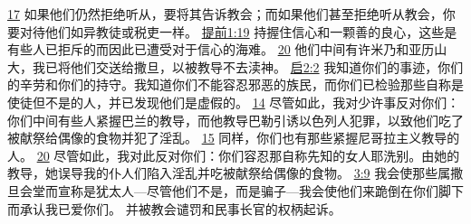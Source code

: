 \documentclass[12pt, a4paper, oneside]{ctexart}
\begin{document}
{		\href{https://biblehub.com/matthew/18-17.htm}{17} 如果他们仍然拒绝听从，要将其告诉教会；而如果他们甚至拒绝听从教会，你要对待他们如异教徒或税吏一样。
		\href{https://biblehub.com/1_timothy/1-19.htm}{提前1:19} 持握住信心和一颗善的良心，这些是有些人已拒斥的而因此已遭受对于信心的海难。
		\href{https://biblehub.com/1_timothy/1-20.htm}{20} 他们中间有许米乃和亚历山大，我已将他们交送给撒旦，以被教导不去渎神。
		\href{https://biblehub.com/revelation/2-2.htm}{启2:2} 我知道你们的事迹，你们的辛劳和你们的持守。我知道你们不能容忍邪恶的族民，而你们已检验那些自称是使徒但不是的人，并已发现他们是虚假的。
		\href{https://biblehub.com/revelation/2-14.htm}{14} 尽管如此，我对少许事反对你们：你们中间有些人紧握巴兰的教导，而他教导巴勒引诱以色列人犯罪，以致他们吃了被献祭给偶像的食物并犯了淫乱。
		\href{https://biblehub.com/revelation/2-15.htm}{15} 同样，你们也有那些紧握尼哥拉主义教导的人。
		\href{https://biblehub.com/revelation/2-20.htm}{20} 尽管如此，我对此反对你们：你们容忍那自称先知的女人耶洗别。由她的教导，她误导我的仆人们陷入淫乱并吃被献祭给偶像的食物。
		\href{https://biblehub.com/revelation/3-9.htm}{3:9} 我会使那些属撒旦会堂而宣称是犹太人---尽管他们不是，而是骗子---我会使他们来跪倒在你们脚下而承认我已爱你们。
	}
	并被教会谴罚和民事长官的权柄起诉。
\end{document}
